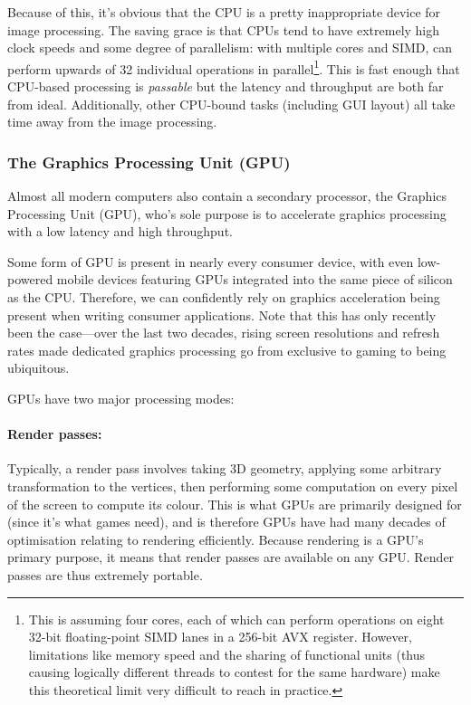 \documentclass[12pt]{article}
\begin{document}
Because of this, it's obvious that the CPU is a pretty inappropriate device for image processing.
The saving grace is that CPUs tend to have extremely high clock speeds and some degree of
parallelism: with multiple cores and SIMD, can perform upwards of 32 individual operations in
parallel\footnote{This is assuming four cores, each of which can perform operations on eight 32-bit
floating-point SIMD lanes in a 256-bit AVX register.  However, limitations like memory speed and the
sharing of functional units (thus causing logically different threads to contest for the same
hardware) make this theoretical limit very difficult to reach in practice.}.  This is fast enough
that CPU-based processing is \emph{passable} but the latency and throughput are both far from ideal.
Additionally, other CPU-bound tasks (including GUI layout) all take time away from the image
processing.

\subsubsection{The Graphics Processing Unit (GPU)}

Almost all modern computers also contain a secondary processor, the Graphics Processing Unit (GPU),
who's sole purpose is to accelerate graphics processing with a low latency and high throughput.

Some form of GPU is present in nearly every consumer device, with even low-powered mobile devices
featuring GPUs integrated into the same piece of silicon as the CPU.  Therefore, we can confidently
rely on graphics acceleration being present when writing consumer applications.  Note that this has
only recently been the case---over the last two decades, rising screen resolutions and refresh
rates made dedicated graphics processing go from exclusive to gaming to being ubiquitous.

GPUs have two major processing modes:

\paragraph{Render passes:} Typically, a render pass involves taking 3D geometry, applying some
arbitrary transformation to the vertices, then performing some computation on every pixel of the
screen to compute its colour.  This is what GPUs are primarily designed for (since it's what games
need), and is therefore GPUs have had many decades of optimisation relating to rendering
efficiently.  Because rendering is a GPU's primary purpose, it means that render passes are
available on any GPU.  Render passes are thus extremely portable.
\end{document}
